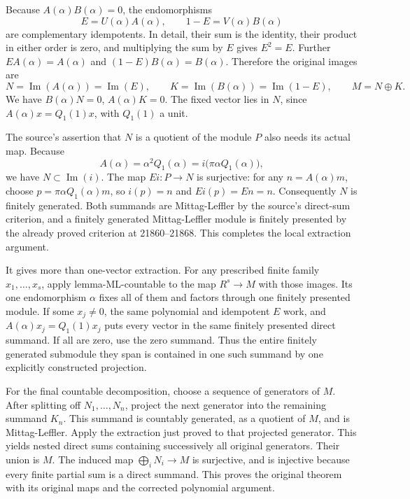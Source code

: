 Because \(A(\alpha)B(\alpha)=0\), the endomorphisms \[
E=U(\alpha)A(\alpha),\qquad
1-E=V(\alpha)B(\alpha)
\] are complementary idempotents. In detail, their sum is the identity, their product in either order is zero, and multiplying the sum by \(E\) gives \(E^2=E\). Further \(EA(\alpha)=A(\alpha)\) and \((1-E)B(\alpha)=B(\alpha)\). Therefore the original images are \[
N=\operatorname{Im}(A(\alpha))=\operatorname{Im}(E),\qquad
K=\operatorname{Im}(B(\alpha))=\operatorname{Im}(1-E),
\qquad M=N\oplus K .
\] We have \(B(\alpha)N=0\), \(A(\alpha)K=0\). The fixed vector lies in \(N\), since \(A(\alpha)x=Q_1(1)x\), with \(Q_1(1)\) a unit.

The source's assertion that \(N\) is a quotient of the module \(P\) also needs its actual map. Because \[
A(\alpha)=\alpha^2Q_1(\alpha)
=i\bigl(\pi\alpha Q_1(\alpha)\bigr),
\] we have \(N\subset\operatorname{Im}(i)\). The map \(Ei:P\to N\) is surjective: for any \(n=A(\alpha)m\), choose \(p=\pi\alpha Q_1(\alpha)m\), so \(i(p)=n\) and \(Ei(p)=En=n\). Consequently \(N\) is finitely generated. Both summands are Mittag-Leffler by the source's direct-sum criterion, and a finitely generated Mittag-Leffler module is finitely presented by the already proved criterion at 21860--21868. This completes the local extraction argument.

It gives more than one-vector extraction. For any prescribed finite family \(x_1,\ldots,x_s\), apply lemma-\AlgebraIdentifierBreak{}ML-\AlgebraIdentifierBreak{}countable to the map \(R^s\to M\) with those images. Its one endomorphism \(\alpha\) fixes all of them and factors through one finitely presented module. If some \(x_j\ne0\), the same polynomial and idempotent \(E\) work, and \(A(\alpha)x_j=Q_1(1)x_j\) puts every vector in the same finitely presented direct summand. If all are zero, use the zero summand. Thus the entire finitely generated submodule they span is contained in one such summand by one explicitly constructed projection.

For the final countable decomposition, choose a sequence of generators of \(M\). After splitting off \(N_1,\ldots,N_n\), project the next generator into the remaining summand \(K_n\). This summand is countably generated, as a quotient of \(M\), and is Mittag-Leffler. Apply the extraction just proved to that projected generator. This yields nested direct sums containing successively all original generators. Their union is \(M\). The induced map \(\bigoplus_iN_i\to M\) is surjective, and is injective because every finite partial sum is a direct summand. This proves the original theorem with its original maps and the corrected polynomial argument.

